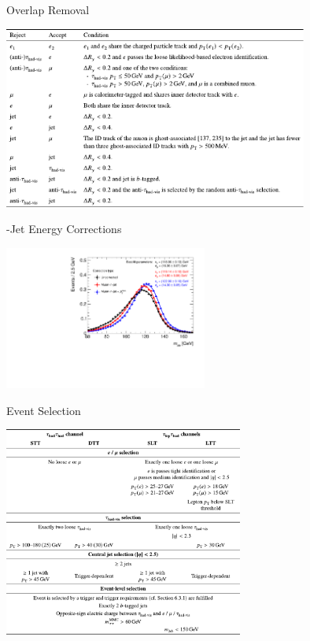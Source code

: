 \documentclass[11pt, xcolor={dvipsnames}, aspectratio=169]{beamer}
\begin{document}

\begin{frame}{Overlap Removal}
  \centering

  \includegraphics[width=0.75\textwidth]{backup/olr}
\end{frame}


\begin{frame}{-Jet Energy Corrections}
  \begin{center}
    \includegraphics[width=0.5\textwidth]{reconstruction/bjet_corrections}
  \end{center}
\end{frame}


\begin{frame}{Event Selection}
  \centering

  \includegraphics[width=0.59\textwidth]{backup/event_selection}
\end{frame}
\end{document}
